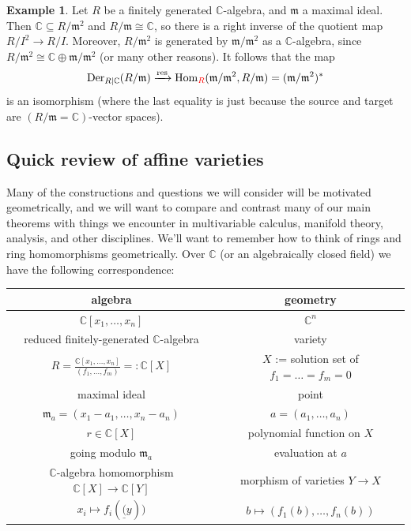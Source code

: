 \documentclass{amsart}[12pt]
\def\Der{\operatorname{Der}}
\newcommand{\Hom}{\mathrm{Hom}}
\newcommand{\C}{\mathbb{C}}
\newcommand{\fm}{{\mathfrak m}}
\numberwithin{equation}{section}
\theoremstyle{plain} %
\theoremstyle{definition}
\newtheorem{ex}[equation]{Example}
\theoremstyle{remark}
\newcommand{\ssec}[1]{\subsection{#1}}
\newcommand{\xra}[1]{\xrightarrow{#1}}
\def\res{\operatorname{res}}
\newcommand{\red}[1]{{\color{red}#1}}
\begin{document}
\begin{ex} Let $R$ be a finitely generated $\C$-algebra, and $\fm$ a maximal ideal. Then $\C\subseteq R/\fm^2$ and $R/\fm\cong \C$, so there is a right inverse of the quotient map $R/I^2 \to R/I$. Moreover, $R/\fm^2$ is generated by $\fm/\fm^2$ as a $\C$-algebra, since $R/\fm^2 \cong \C \oplus \fm/\fm^2$ (or many other reasons). It follows that the map
\[ \Der_{R|\C}(R/\fm) \xra{\res} \Hom_{\red{R}}(\fm/\fm^2,R/\fm) = (\fm/\fm^2)^*\]
is an isomorphism (where the last equality is just because the source and target are $(R/\fm=\C)$-vector spaces).
\end{ex}


\ssec{Quick review of affine varieties}

Many of the constructions and questions we will consider will be motivated geometrically, and we will want to compare and contrast many of our main theorems with things we encounter in multivariable calculus, manifold theory, analysis, and other disciplines. We'll want to remember how to think of rings and ring homomorphisms geometrically. Over $\C$ (or an algebraically closed field) we have the following correspondence:

\begin{center}
\begin{tabular}{c|c}
algebra & geometry \\ \hline \hline
$\C[x_1,\dots,x_n]$ & $\C^n$ \\ \hline
 reduced finitely-generated $\C$-algebra & variety \\ \hline
 $R=\displaystyle\frac{ \C[x_1,\dots,x_n]}{(f_1,\dots,f_m)}=:\C[X]$ & $X$ := solution set of $f_1=\dots=f_m=0$ \\ \hline

maximal ideal & point \\
$\fm_a = (x_1-a_1,\dots,x_n-a_n)$ & $a=(a_1,\dots,a_n)$ \\ \hline
$r\in \C[X]$ & polynomial function on $X$ \\ \hline
going modulo $\fm_a$ & evaluation at $a$ \\ \hline
$\C$-algebra homomorphism $\C[X]\to \C[Y]$  & morphism of varieties $Y\to X$ \\
$x_i \mapsto f_i(\underline(y))$ & $b\mapsto (f_1(b), \dots,f_n(b))$
\end{tabular}
\end{center}
\end{document}
